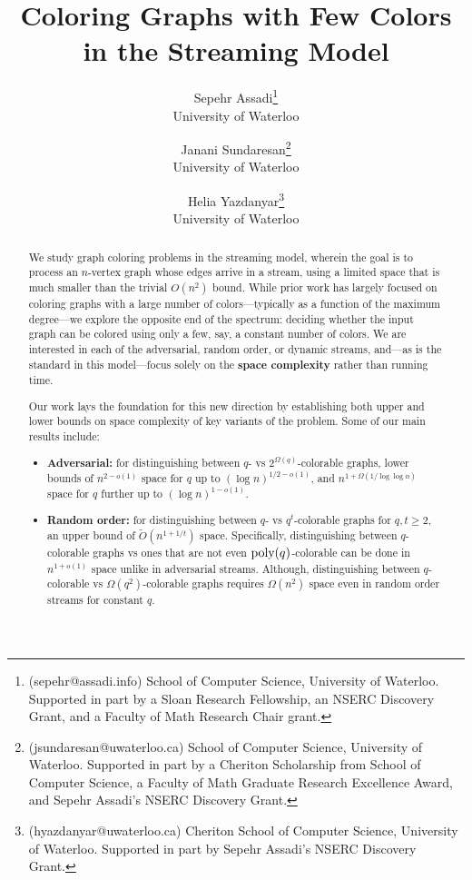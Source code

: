 \documentclass[11pt]{article}
\title{Coloring Graphs with Few Colors in the Streaming Model}
\author{Sepehr Assadi\footnote{(sepehr@assadi.info) School of Computer Science, University of Waterloo. 
Supported in part by a Sloan Research Fellowship, an NSERC
Discovery Grant, and a Faculty of Math Research Chair grant. \smallskip} \\ {\small University of Waterloo} \and 
Janani Sundaresan\footnote{(jsundaresan@uwaterloo.ca) School of Computer Science, University of Waterloo. Supported in part by a Cheriton Scholarship from School of Computer Science, a Faculty of Math Graduate Research Excellence Award, and Sepehr Assadi's NSERC Discovery Grant. \smallskip} \\ {\small University of Waterloo}
\and Helia Yazdanyar\footnote{(hyazdanyar@uwaterloo.ca) Cheriton School of Computer Science, University of Waterloo. Supported in part by Sepehr Assadi's NSERC Discovery Grant.} \\ {\small University of Waterloo}
}
\date{}
\theoremstyle{definition}
\renewcommand{\geq}{\geqslant}
\newcommand{\Ot}{\ensuremath{\widetilde{O}}}
\newcommand{\poly}{\mbox{\rm poly}}
\begin{document}
	\maketitle
	
	

\begin{abstract}

\bigskip

We study graph coloring problems in the streaming model, wherein the goal is to process an $n$-vertex graph whose edges arrive in a stream, using a limited space that is much smaller than the trivial $O(n^2)$ bound. 
While prior work has largely focused on coloring graphs with a large number of colors---typically as a function of the maximum degree---we explore the opposite end of the spectrum: 
deciding whether the input graph can be colored using only a few, say, a constant number of colors. We are interested in each of the adversarial, random order, or dynamic streams, and---as is the standard in this model---focus
 solely on the \textbf{space complexity} rather than running time.  

\smallskip

Our work lays the foundation for this new direction by establishing both upper and lower bounds on space complexity of key variants of the problem. Some of our main results include:

\smallskip

\begin{itemize}[leftmargin=10pt]
	\item \textbf{Adversarial:} for distinguishing between $q$- vs $2^{\Omega(q)}$-colorable graphs, lower bounds of $n^{2-o(1)}$ space  for $q$ up to $(\log{n})^{1/2-o(1)}$, and $n^{1+\Omega(1/\log\log{n})}$ space for $q$ further up to $(\log{n})^{1-o(1)}$. 
	\smallskip
	
	\item \textbf{Random order:} for distinguishing between $q$- vs $q^t$-colorable graphs for $q,t \geq 2$, an upper bound of $\Ot(n^{1+1/t})$ space.  
	Specifically, distinguishing between $q$-colorable graphs vs ones that are not even $\poly(q)$-colorable can be done in $n^{1+o(1)}$ space unlike in adversarial streams. Although, 
	distinguishing between $q$-colorable vs $\Omega(q^2)$-colorable graphs requires $\Omega(n^2)$ space even in random order streams for constant $q$. 
	
	\smallskip
	

\end{itemize}
\end{abstract}
\end{document}
